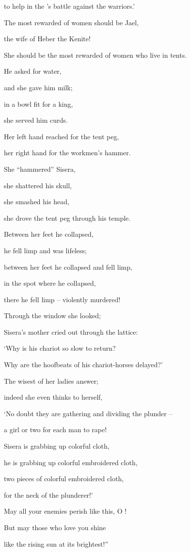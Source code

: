 {\par }{\Q to help
in the
{}’s
battle against the warriors.’
\par }{\Q {}The most rewarded
of women
should be Jael,
\par }{\Q the wife
of Heber
the Kenite!
\par }{\Q She should be
the most rewarded
of women
who live in tents.
\par }{\Q {}He asked
for water,
\par }{\Q and she gave
him milk;
\par }{\Q in a bowl
fit for a king,
\par }{\Q she served
him curds.
\par }{\Q {}Her left hand
reached
for the tent peg,
\par }{\Q her right hand
for the workmen’s hammer.
\par }{\Q She “hammered” Sisera,
\par }{\Q she shattered his skull,
\par }{\Q she smashed his head,
\par }{\Q she drove the tent peg through his temple.
\par }{\Q {}Between
her feet
he collapsed,
\par }{\Q he fell limp
and was lifeless;
\par }{\Q between
her feet
he collapsed
and fell limp,
\par }{\Q in the spot where
he collapsed,
\par }{\Q there
he fell limp
– violently murdered!
\par }{\Q {}Through
the window
she looked;
\par }{\Q Sisera’s
mother
cried
out through
the lattice:
\par }{\Q ‘Why
is his chariot
so slow
to return?
\par }{\Q Why
are the hoofbeats
of his chariot-horses
delayed?’
\par }{\Q {}The wisest
of her ladies
answer;
\par }{\Q indeed
she
even thinks to herself,
\par }{\Q {}‘No
doubt they are gathering
and dividing
the plunder –
\par }{\Q a girl
or two
for each
man
to rape!

\par }{\Q Sisera
is grabbing up
colorful cloth,
\par }{\Q he is grabbing up
colorful
embroidered
cloth,
\par }{\Q two pieces of colorful
embroidered
cloth,
\par }{\Q for the neck
of the plunderer!’
\par }{\Q {}May all
your enemies
perish
like this,
O
{}!
\par }{\Q But may those who love
you shine
\par }{\Q like the rising sun
at its brightest!”

}

